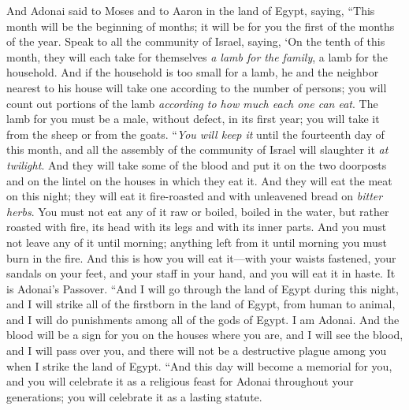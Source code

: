 \begin{biblechapter} %
 And Adonai said to Moses and to Aaron in the land of Egypt, saying,
\verse “This month will be the beginning of months; it will be for you the first of the months of the year.
\verse Speak to all the community of Israel, saying, ‘On the tenth of this month, they will each take for themselves \textit{a lamb for the family}, a lamb for the household.
\verse And if the household is too small for a lamb, he and the neighbor nearest to his house will take one according to the number of persons; you will count out portions of the lamb \textit{according to how much each one can eat}.
\verse The lamb for you must be a male, without defect, in its first year; you will take it from the sheep or from the goats.
\verse “\textit{You will keep it} until the fourteenth day of this month, and all the assembly of the community of Israel will slaughter it \textit{at twilight}.
\verse And they will take some of the blood and put it on the two doorposts and on the lintel on the houses in which they eat it.
\verse And they will eat the meat on this night; they will eat it fire-roasted and with unleavened bread on \textit{bitter herbs}.
\verse You must not eat any of it raw or boiled, boiled in the water, but rather roasted with fire, its head with its legs and with its inner parts.
\verse And you must not leave any of it until morning; anything left from it until morning you must burn in the fire.
\verse And this is how you will eat it—with your waists fastened, your sandals on your feet, and your staff in your hand, and you will eat it in haste. It is Adonai’s Passover.
\verse “And I will go through the land of Egypt during this night, and I will strike all of the firstborn in the land of Egypt, from human to animal, and I will do punishments among all of the gods of Egypt. I am Adonai.
\verse And the blood will be a sign for you on the houses where you are, and I will see the blood, and I will pass over you, and there will not be a destructive plague among you when I strike the land of Egypt.
\verse “And this day will become a memorial for you, and you will celebrate it as a religious feast for Adonai throughout your generations; you will celebrate it as a lasting statute.

\end{biblechapter}
